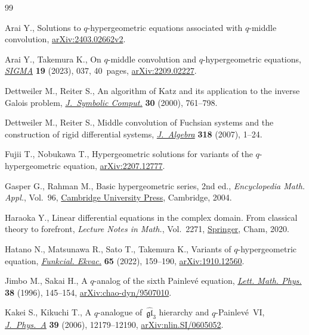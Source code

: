 \documentclass[pdftex]{sigma}
\numberwithin{equation}{section}
\theoremstyle{definition}
\begin{document}
\begin{thebibliography}{99}
\footnotesize\itemsep=0pt

Arai Y.,
Solutions to $q$-hypergeometric equations associated with $q$-middle convolution,
 \href{http://arxiv.org/abs/2403.02662v2}{arXiv:2403.02662v2}.

Arai Y., Takemura K., On {$q$}-middle convolution and {$q$}-hypergeometric
 equations, \href{https://doi.org/10.3842/SIGMA.2023.037}{\textit{SIGMA}}
 \textbf{19} (2023), 037, 40~pages,
 \href{http://arxiv.org/abs/2209.02227}{arXiv:2209.02227}.

Dettweiler M., Reiter S., An algorithm of {K}atz and its application to the
 inverse {G}alois problem, \href{https://doi.org/10.1006/jsco.2000.0382}{\textit{J.~Symbolic Comput.}} \textbf{30} (2000), 761--798.

Dettweiler M., Reiter S., Middle convolution of {F}uchsian systems and the
 construction of rigid differential systems,
 \href{https://doi.org/10.1016/j.jalgebra.2007.08.029}{\textit{J.~Algebra}}
 \textbf{318} (2007), 1--24.

Fujii T., Nobukawa T., Hypergeometric solutions for variants of the
 $q$-hypergeometric equation,
 \href{http://arxiv.org/abs/2207.12777}{arXiv:2207.12777}.

Gasper G., Rahman M., Basic hypergeometric series, 2nd ed., \textit{Encyclopedia Math.
 Appl.}, Vol.~96,
 \href{https://doi.org/10.1017/CBO9780511526251}{Cambridge University Press},
 Cambridge, 2004.

Haraoka Y., Linear differential equations in the complex domain. {F}rom
 classical theory to forefront, \textit{Lecture Notes in Math.}, Vol.~2271,
 \href{https://doi.org/10.1007/978-3-030-54663-2}{Springer}, Cham, 2020.

Hatano N., Matsunawa R., Sato T., Takemura K., Variants of {$q$}-hypergeometric
 equation, \href{https://doi.org/10.1619/fesi.65.159}{\textit{Funkcial.
 Ekvac.}} \textbf{65} (2022), 159--190,
 \href{http://arxiv.org/abs/1910.12560}{arXiv:1910.12560}.

Jimbo M., Sakai H., A {$q$}-analog of the sixth {P}ainlev\'e equation,
 \href{https://doi.org/10.1007/BF00398316}{\textit{Lett. Math. Phys.}}
 \textbf{38} (1996), 145--154,
 \href{http://arxiv.org/abs/chao-dyn/9507010}{arXiv:chao-dyn/9507010}.

Kakei S., Kikuchi T., A {$q$}-analogue of~{$\widehat{\mathfrak{gl}}_3$}
 hierarchy and {$q$}-{P}ainlev\'e~{VI},
 \href{https://doi.org/10.1088/0305-4470/39/39/S11}{\textit{J.~Phys.~A}}
 \textbf{39} (2006), 12179--12190,
 \href{http://arxiv.org/abs/nlin.SI/0605052}{arXiv:nlin.SI/0605052}.


\end{thebibliography}
\end{document}
